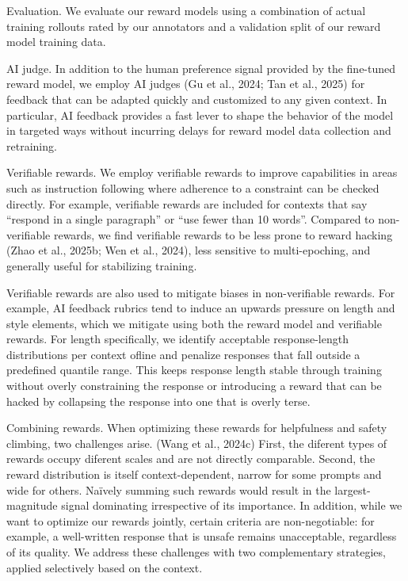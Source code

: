 \documentclass[
  10
]{article}
\begin{document}
Evaluation. We evaluate our reward models using a combination of actual
training rollouts rated by our annotators and a validation split of our
reward model training data.

AI judge. In addition to the human preference signal provided by the
fine-tuned reward model, we employ AI judges (Gu et al., 2024; Tan et
al., 2025) for feedback that can be adapted quickly and customized to
any given context. In particular, AI feedback provides a fast lever to
shape the behavior of the model in targeted ways without incurring
delays for reward model data collection and retraining.

Verifiable rewards. We employ verifiable rewards to improve capabilities
in areas such as instruction following where adherence to a constraint
can be checked directly. For example, verifiable rewards are included
for contexts that say ``respond in a single paragraph'' or ``use fewer
than 10 words''. Compared to non-verifiable rewards, we find verifiable
rewards to be less prone to reward hacking (Zhao et al., 2025b; Wen et
al., 2024), less sensitive to multi-epoching, and generally useful for
stabilizing training.

Verifiable rewards are also used to mitigate biases in non-verifiable
rewards. For example, AI feedback rubrics tend to induce an upwards
pressure on length and style elements, which we mitigate using both the
reward model and verifiable rewards. For length specifically, we
identify acceptable response-length distributions per context ofline and
penalize responses that fall outside a predefined quantile range. This
keeps response length stable through training without overly
constraining the response or introducing a reward that can be hacked by
collapsing the response into one that is overly terse.

Combining rewards. When optimizing these rewards for helpfulness and
safety climbing, two challenges arise. (Wang et al., 2024c) First, the
diferent types of rewards occupy diferent scales and are not directly
comparable. Second, the reward distribution is itself context-dependent,
narrow for some prompts and wide for others. Naïvely summing such
rewards would result in the largest-magnitude signal dominating
irrespective of its importance. In addition, while we want to optimize
our rewards jointly, certain criteria are non-negotiable: for example, a
well-written response that is unsafe remains unacceptable, regardless of
its quality. We address these challenges with two complementary
strategies, applied selectively based on the context.
\end{document}
